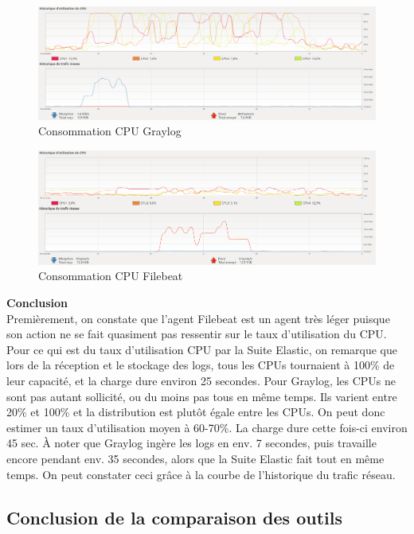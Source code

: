 \documentclass[paper=a4, fontsize=11pt]{scrartcl}
\begin{document}
\begin{figure}[H]
    \centering
    \includegraphics[width=18cm]{img/screenshots/Graylog_CPU_MEM_Receive_modified.png}
    \caption{Consommation CPU Graylog}
    \label{f-GraylogCPU}
\end{figure}

\begin{figure}[H]
    \centering
    \includegraphics[width=18cm]{img/screenshots/Filebeat_send_modified.png}
    \caption{Consommation CPU Filebeat}
    \label{f-FilebeatCPU}
\end{figure}

\textbf{Conclusion} \\
Premièrement, on constate que l'agent Filebeat est un agent très léger puisque son action ne se fait quasiment pas ressentir sur le taux d'utilisation du CPU. Pour ce qui est du taux d'utilisation CPU par la Suite Elastic, on remarque que lors de la réception et le stockage des logs, tous les CPUs tournaient à 100\% de leur capacité, et la charge dure environ 25 secondes. Pour Graylog, les CPUs ne sont pas autant sollicité, ou du moins pas tous en même temps. Ils varient entre 20\% et 100\% et la distribution est plutôt égale entre les CPUs. On peut donc estimer un taux d'utilisation moyen à 60-70\%. La charge dure cette fois-ci environ 45 sec. À noter que Graylog ingère les logs en env. 7 secondes, puis travaille encore pendant env. 35 secondes, alors que la Suite Elastic fait tout en même temps. On peut constater ceci grâce à la courbe de l'historique du trafic réseau.

\subsection{Conclusion de la comparaison des outils}
\end{document}
